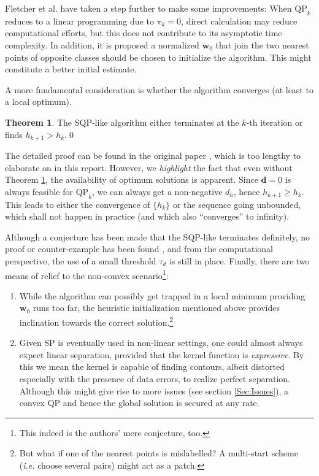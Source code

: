 \documentclass[11pt,a4paper]{article}
\theoremstyle{definition}
\newtheorem{theo}{Theorem}
\renewcommand{\vec}[1]{\boldsymbol{#1}}
\begin{document}
      Fletcher et al. \cite{fletcher2010binary} have taken a step further to make some improvements: When $\text{QP}_{k}$ reduces to a linear programming due to $\pi_{k}=0$, direct calculation may reduce computational efforts, but this does not contribute to its asymptotic time complexity. In addition, it is proposed a normalized $\vec{w}_{0}$ that join the two nearest points of opposite classes should be chosen to initialize the algorithm. This might constitute a better initial estimate.

      A more fundamental consideration is whether the algorithm converges (at least to a local optimum).

      \begin{theo}\label{Theo:SQPConv}
        The SQP-like algorithm either terminates at the $k$-th iteration or finds $h_{k+1}>h_{k}$.\qed
      \end{theo}
      The detailed proof can be found in the original paper \cite[Theorem 4.1]{fletcher2010binary}, which is too lengthy to elaborate on in this report. However, we \emph{highlight} the fact that even without Theorem \ref{Theo:SQPConv}, the availability of optimum solutions is apparent. Since $\vec{d}=0$ is always feasible for $\text{QP}_{k}$, we can always get a non-negative $d_{h}$, hence $h_{k+1}\geq h_{k}$. This leads to either the convergence of $\{h_{k}\}$ or the sequence going unbounded, which shall not happen in practice (and which also ``converges'' to infinity).

      Although a conjecture has been made that the SQP-like terminates definitely, no proof or counter-example has been found \cite{fletcher2010binary}, and from the computational perspective, the use of a small threshold $\tau_{d}$ is still in place. Finally, there are two means of relief to the non-convex scenario\footnote{This indeed is the authors' mere conjecture, too.}:
      \begin{enumerate}
        \item While the algorithm can possibly get trapped in a local minimum providing $\vec{w}_{0}$ runs too far, the heuristic initialization mentioned above provides inclination towards the correct solution.\footnote{But what if one of the nearest points is mislabelled? A multi-start scheme (\textit{i.e.} choose several pairs) might act as a patch.}
        \item Given SP is eventually used in non-linear settings, one could almost always expect linear separation, provided that the kernel function is \textit{expressive}. By this we mean the kernel is capable of finding contours, albeit distorted especially with the presence of data errors, to realize perfect separation. Although this might give rise to more issues (see section \ref{Sec:Issues}), a convex QP and hence the global solution is secured at any rate.
      \end{enumerate}
\end{document}
